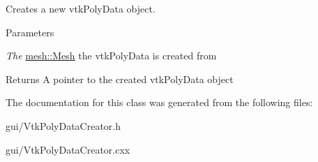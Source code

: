 Creates a new vtkPolyData object. 


\begin{DoxyParams}{Parameters}
\item[{\em The}]\hyperlink{classmesh_1_1_mesh}{mesh::Mesh} the vtkPolyData is created from \end{DoxyParams}
\begin{DoxyReturn}{Returns}
A pointer to the created vtkPolyData object 
\end{DoxyReturn}


The documentation for this class was generated from the following files:\begin{DoxyCompactItemize}
\item 
gui/VtkPolyDataCreator.h\item 
gui/VtkPolyDataCreator.cxx\end{DoxyCompactItemize}
